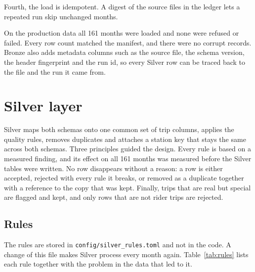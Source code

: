 \documentclass[11pt,a4paper]{article}
\newcommand{\code}[1]{\texttt{\small #1}}
\begin{document}
Fourth, the load is idempotent. A digest of the source files in the ledger lets a repeated run skip unchanged months.

On the production data all 161 months were loaded and none were refused or failed. Every row count matched the manifest,
and there were no corrupt records. Bronze also adds metadata columns such as the source file, the schema version, the
header fingerprint and the run id, so every Silver row can be traced back to the file and the run it came from.

\section{Silver layer}
\label{sec:silver}

Silver maps both schemas onto one common set of trip columns, applies the quality rules, removes duplicates and attaches a
station key that stays the same across both schemas. Three principles guided the design. Every rule is based on a
measured finding, and its effect on all 161 months was measured before the Silver tables were written. No row disappears
without a reason: a row is either accepted, rejected with every rule it breaks, or removed as a duplicate together with a
reference to the copy that was kept. Finally, trips that are real but special are flagged and kept, and only rows that are
not rider trips are rejected.

\subsection{Rules}

The rules are stored in \code{config/silver\_rules.toml} and not in the code. A change of this file makes Silver process
every month again. Table~\ref{tab:rules} lists each rule together with the problem in the data that led to it.
\end{document}
